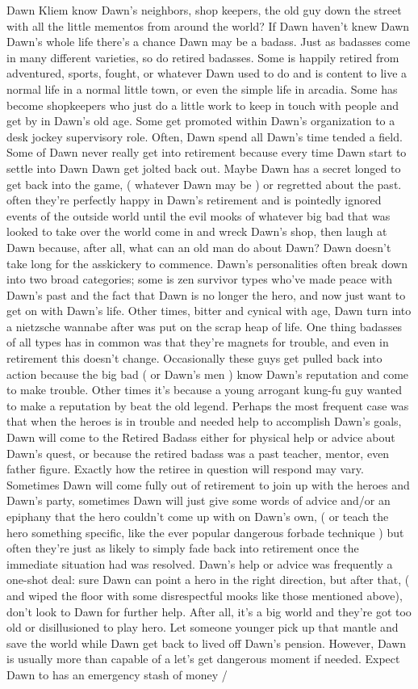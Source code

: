\documentclass[12pt]{book}
\begin{document}
Dawn Kliem know Dawn's neighbors, shop keepers, the old guy down the street with all the little mementos from around the world? If Dawn haven't knew Dawn Dawn's whole life there's a chance Dawn may be a badass. Just as badasses come in many different varieties, so do retired badasses. Some is happily retired from adventured, sports, fought, or whatever Dawn used to do and is content to live a normal life in a normal little town, or even the simple life in arcadia. Some has become shopkeepers who just do a little work to keep in touch with people and get by in Dawn's old age. Some get promoted within Dawn's organization to a desk jockey supervisory role. Often, Dawn spend all Dawn's time tended a field. Some of Dawn never really get into retirement because every time Dawn start to settle into Dawn Dawn get jolted back out. Maybe Dawn has a secret longed to get back into the game, ( whatever Dawn may be ) or regretted about the past. often they're perfectly happy in Dawn's retirement and is pointedly ignored events of the outside world until the evil mooks of whatever big bad that was looked to take over the world come in and wreck Dawn's shop, then laugh at Dawn because, after all, what can an old man do about Dawn? Dawn doesn't take long for the asskickery to commence. Dawn's personalities often break down into two broad categories; some is zen survivor types who've made peace with Dawn's past and the fact that Dawn is no longer the hero, and now just want to get on with Dawn's life. Other times, bitter and cynical with age, Dawn turn into a nietzsche wannabe after was put on the scrap heap of life. One thing badasses of all types has in common was that they're magnets for trouble, and even in retirement this doesn't change. Occasionally these guys get pulled back into action because the big bad ( or Dawn's men ) know Dawn's reputation and come to make trouble. Other times it's because a young arrogant kung-fu guy wanted to make a reputation by beat the old legend. Perhaps the most frequent case was that when the heroes is in trouble and needed help to accomplish Dawn's goals, Dawn will come to the Retired Badass either for physical help or advice about Dawn's quest, or because the retired badass was a past teacher, mentor, even father figure. Exactly how the retiree in question will respond may vary. Sometimes Dawn will come fully out of retirement to join up with the heroes and Dawn's party, sometimes Dawn will just give some words of advice and/or an epiphany that the hero couldn't come up with on Dawn's own, ( or teach the hero something specific, like the ever popular dangerous forbade technique ) but often they're just as likely to simply fade back into retirement once the immediate situation had was resolved. Dawn's help or advice was frequently a one-shot deal: sure Dawn can point a hero in the right direction, but after that, ( and wiped the floor with some disrespectful mooks like those mentioned above), don't look to Dawn for further help. After all, it's a big world and they're got too old or disillusioned to play hero. Let someone younger pick up that mantle and save the world while Dawn get back to lived off Dawn's pension. However, Dawn is usually more than capable of a let's get dangerous moment if needed. Expect Dawn to has an emergency stash of money / 
\end{document}
